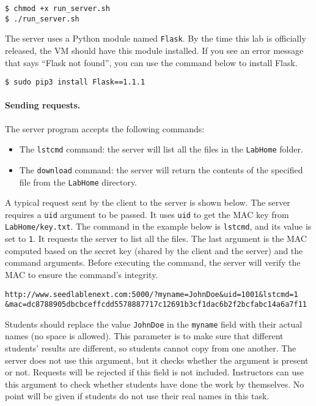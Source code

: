 \begin{lstlisting}
$ chmod +x run_server.sh
$ ./run_server.sh
\end{lstlisting}

The server uses a Python module named \texttt{Flask}. By the time this lab is
officially released, the VM should have this module installed. 
If you see an error message that says ``Flask not found'',
you can use the command below to install Flask. 

\begin{lstlisting}
$ sudo pip3 install Flask==1.1.1
\end{lstlisting}


\paragraph{Sending requests.} The server program accepts the following commands:

\begin{itemize}
\item The \texttt{lstcmd} command: the server will list all the files in the
\texttt{LabHome} folder.
\item The \texttt{download} command: the server will return the contents of the 
specified file from the \texttt{LabHome} directory.
\end{itemize}

A typical request sent by the client to the server is shown below. 
The server requires a \texttt{uid} argument to be passed. It uses 
\texttt{uid} to get the MAC key from 
\texttt{LabHome/key.txt}. The command 
in the example below is \texttt{lstcmd}, and its value is set to \texttt{1}. It requests
the server to list all the files. The last argument is the MAC computed based on the 
secret key (shared by the client and the server) and the command arguments.
Before executing the command, the server will verify the MAC to ensure
the command's integrity. 

\begin{lstlisting}
http://www.seedlablenext.com:5000/?myname=JohnDoe&uid=1001&lstcmd=1
&mac=dc8788905dbcbceffcdd5578887717c12691b3cf1dac6b2f2bcfabc14a6a7f11
\end{lstlisting}


Students should replace the value \texttt{JohnDoe} in the 
\texttt{myname} field with their actual names (no space 
is allowed). This parameter is to make sure that different students'
results are different, so students cannot copy from one
another. The server does not use this argument, but it checks 
whether the argument is present or not. Requests will be rejected
if this field is not included. 
Instructors
can use this argument to check whether students have done the work by
themselves. No point will be given if students do not use
their real names in this task.



